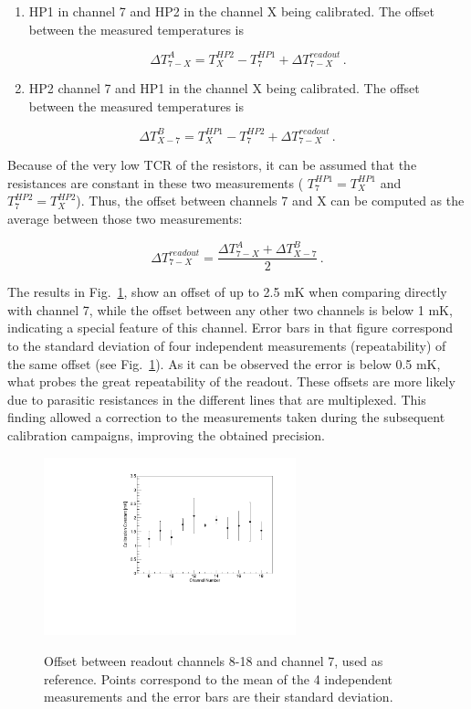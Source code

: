 \begin{enumerate}%
    \item HP1 in channel 7 and HP2 in the channel X being calibrated. The offset between the measured temperatures is

    \begin{equation}
        \Delta T_{7-X}^A = T_{X}^{HP2}-T_{7}^{HP1}+\Delta T_{7-X}^{readout} \, .
    \end{equation}

    \item HP2 channel 7 and HP1 in the channel X being calibrated. The offset between the measured temperatures is
\end{enumerate}

    \begin{equation}
        \Delta T_{X-7}^B = T_{X}^{HP1}-T_{7}^{HP2}+\Delta T_{7-X}^{readout} \, .
    \end{equation}

\noindent
Because of the very low TCR of the resistors, it can be assumed that the resistances are constant in these two measurements ( $T_{7}^{HP1}=T_{X}^{HP1}$ and $T_{7}^{HP2}=T_{X}^{HP2}$). Thus, the offset between channels 7 and X can be computed as the average between those two measurements:

\begin{equation}
    \Delta T_{7-X}^{readout} = \frac{\Delta T^{A}_{7-X} + \Delta T^{B}_{X-7}}{2} \, .
\end{equation}

The results in Fig.~\ref{fig:readout_calib}, show an offset of up to 2.5 mK when comparing directly with channel 7, while the offset between any other two channels is below 1 mK, indicating a special feature of this channel. Error bars in that figure correspond to the standard deviation of four independent measurements (repeatability) of the same offset (see Fig.~\ref{fig:readout_calib}). As it can be observed the error is below 0.5 mK, what probes the great repeatability of the readout. These offsets are more likely due to parasitic resistances in the different lines that are multiplexed. This finding allowed a correction to the measurements taken during the subsequent calibration campaigns, improving the obtained precision.

\begin{figure}[htbp]
\centering
{\includegraphics[width=0.65\textwidth]{./figure_3.pdf}}
\caption{Offset between readout channels 8-18 and channel 7, used as reference. Points correspond to the mean of the 4 independent measurements and the error bars are their standard deviation.}
\label{fig:readout_calib}
\end{figure}